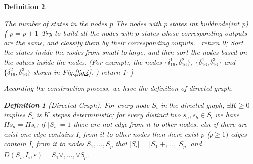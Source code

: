 \documentclass[conference]{IEEEtran} %
\newtheorem{definition}{Definition}
\begin{document}
\begin{definition}
\begin{algorithm}[h]
\begin{algorithmic}[1]
The number of states in the nodes $p$
\ENSURE  
The nodes with $p$ states
\STATE int buildnode(int p)
\STATE  \{ 
\STATE $p=p+1$\
\STATE  Try to build all the nodes with $p$ states whose corresponding outputs are the same, and classify them by their corresponding outputs.\
\STATE  return 0;
\ELSE 
\STATE Sort the states inside the nodes from small to large, and then sort the nodes based on the values inside the nodes. (For example, the nodes $\{\delta_{16}^1,\delta_{16}^2\}$, $\{\delta_{16}^1,\delta_{16}^3\}$ and $\{\delta_{16}^2,\delta_{16}^3\}$ shown in {\em Fig.\ref{fig:4}}. )
\STATE return 1;
\ENDIF 
\STATE \}
\end{algorithmic}
\end{algorithm}

According the construction process, we have the definition of directed graph.
\begin{definition}[Directed Graph]
For every node $S_i$ in the directed graph, $\exists K \ge 0$ implies $S_i$ is $K$ stepes deterministic; for every distinct two $s_a, s_b \in S_i$ we have $Hs_a=Hs_b$; if $|S_i|=1$ there are not edge from it to other nodes, else if there are exist one edge contains $I_i$ from it to other nodes then there exist $p$ ($p\ge 1)$ edges contain $I_i$ from it to nodes $S_1,...,S_p$ that $|S_i|= |S_1|+,...,|S_p|$ and $D\left(S_i,I_i,\varepsilon\right)=S_1\vee,...,\vee S_p$.
\end{definition}


\end{definition}
\end{document}

